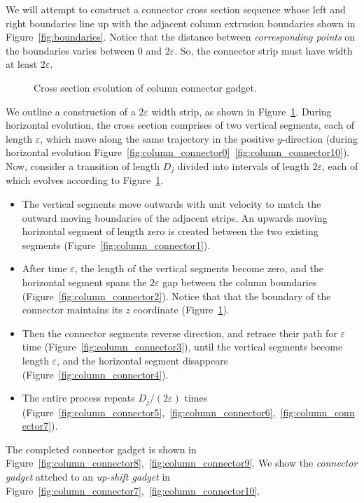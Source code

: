 We will attempt to construct a connector cross section sequence whose left and right boundaries
line up with the adjacent column extrusion boundaries shown in Figure~\ref{fig:boundaries}.
Notice that the distance between \emph{corresponding points} on the boundaries varies between $0$ and $2\varepsilon$.
So, the connector strip must have width at least $2\varepsilon$.
\graphicspath{{./figures/}}
\begin{figure}[htb]
    \def\svgwidth{1.1\textwidth}
    \caption{
    Cross section evolution of column connector gadget.
    }
    \label{fig:connector_cross_section}
\end{figure}

We outline a construction of a $2\varepsilon$ width strip, as shown in Figure~\ref{fig:connector_cross_section}.
During horizontal evolution, the cross section comprises of two vertical segments, each of length $\varepsilon$,
which move along the same trajectory in the positive $y$-direction (during horizontal evolution Figure~\ref{fig:column_connector0}~\ref{fig:column_connector10}).
Now, consider a transition of length $D_j$ divided into intervals of length $2\varepsilon$, each of which evolves according to Figure~\ref{fig:connector_cross_section}.



\begin{itemize}
    \item The vertical segments move outwards with unit velocity to match the outward moving boundaries of the adjacent strips.
          An upwards moving horizontal segment of length zero is created between the two existing segments (Figure~\ref{fig:column_connector1}).
    \item After time $\varepsilon$, the length of the vertical segments become zero,
          and the horizontal segment spans the $2\varepsilon$ gap between the column boundaries (Figure~\ref{fig:column_connector2}).
          Notice that that the boundary of the connector maintains its $z$ coordinate (Figure~\ref{fig:connector_cross_section}).
    \item Then the connector segments reverse direction, and retrace their path for $\varepsilon$ time (Figure~\ref{fig:column_connector3}),
          until the vertical segments become length $\varepsilon$, and the horizontal segment disappears (Figure~\ref{fig:column_connector4}).
    \item The entire process repeats $D_j/(2\varepsilon)$ times (Figure~\ref{fig:column_connector5},~\ref{fig:column_connector6},~\ref{fig:column_connector7}).
\end{itemize}

The completed connector gadget is shown in Figure~\ref{fig:column_connector8},~\ref{fig:column_connector9}.
We show the \emph{connector gadget} attched to an \emph{up-shift gadget} in Figure~\ref{fig:column_connector7},~\ref{fig:column_connector10}.


